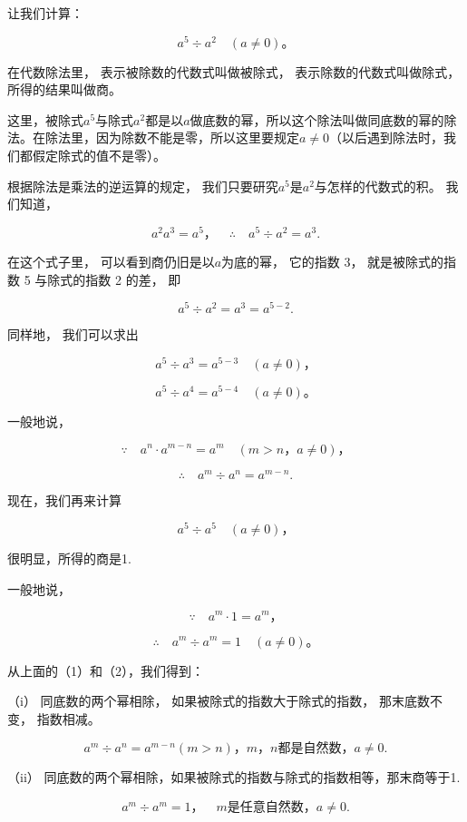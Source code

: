 让我们计算：

\[
a ^{5} \div a ^{2} \quad (a \neq 0)\text{。}
\]

在代数除法里， 表示被除数的代数式叫做被除式， 表示除数的代数式叫做除式，
所得的结果叫做商。

这里，被除式\(a^5\)与除式\(a^2\)都是以\(a\)做底数的幂，所以这个除法叫做同底数的幂的除法。在除法里，因为除数不能是零，所以这里要规定\(a \neq 0\)（以后遇到除法时，我们都假定除式的值不是零）。

根据除法是乘法的逆运算的规定，
我们只要研究\(a^5\)是\(a^2\)与怎样的代数式的积。 我们知道，

\[
a ^{2} a ^{3} = a ^{5}\text{，} \quad \therefore \quad a ^{5} \div a ^{2} = a ^{3}.
\]

在这个式子里， 可以看到商仍旧是以\(a\)为底的幂， 它的指数 3，
就是被除式的指数 5 与除式的指数 2 的差， 即

\[
a ^{5} \div a ^{2} = a ^{3} = a ^{5 - 2}.
\]

同样地， 我们可以求出

\[
a ^{5} \div a ^{3} = a ^{5 - 3} \quad (a \neq 0)\text{，}
\]

\[
a ^{5} \div a ^{4} = a ^{5 - 4} \quad (a \neq 0)\text{。}
\]

一般地说，

\[
\because \quad a ^{n} \cdot a ^{m - n} = a ^{m} \quad (m > n\text{，} a \neq 0)\text{，}
\]

\[
\therefore \quad a ^{m} \div a ^{n} = a ^{m - n}. \tag {1}
\]

现在，我们再来计算

\[
a ^{5} \div a ^{5} \quad (a \neq 0)\text{，}
\]

很明显，所得的商是1.

一般地说，

\[
\because \quad a ^{m} \cdot 1 = a ^{m}\text{，}
\]

\[
\therefore \quad a ^{m} \div a ^{m} = 1 \quad (a \neq 0)\text{。} \tag {2}
\]

从上面的（1）和（2），我们得到：

（i） 同底数的两个幂相除， 如果被除式的指数大于除式的指数，
那末底数不变， 指数相减。

\[
a ^{m} \div a ^{n} = a ^{m - n} (m > n)\text{，} m\text{，} n \text{都是自然数}\text{，} a \neq 0.
\]

（ii）
同底数的两个幂相除，如果被除式的指数与除式的指数相等，那末商等于1.

\[
a ^{m} \div a ^{m} = 1\text{，} \quad m \text{是任意自然数，} a \neq 0.
\]

